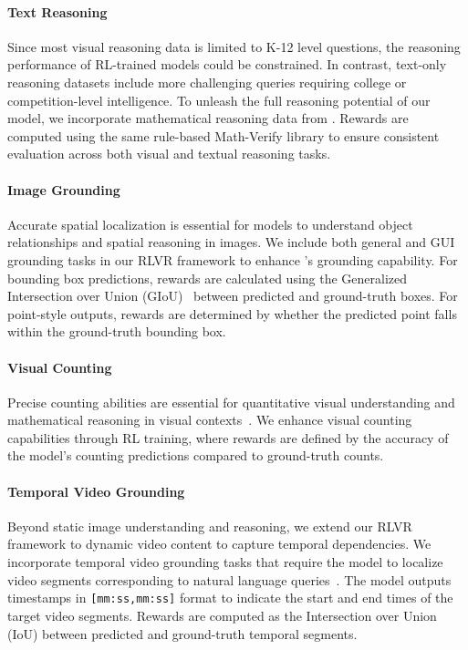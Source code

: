 \paragraph{Text Reasoning}
Since most visual reasoning data is limited to K-12 level questions, the reasoning performance of RL-trained models could be constrained.
In contrast, text-only reasoning datasets include more challenging queries requiring college or competition-level intelligence.
To unleash the full reasoning potential of our model, we incorporate mathematical reasoning data from \citet{xia2025mimo}. Rewards are computed using the same rule-based Math-Verify library to ensure consistent evaluation across both visual and textual reasoning tasks.


\paragraph{Image Grounding}
Accurate spatial localization is essential for models to understand object relationships and spatial reasoning in images. We include both general and GUI grounding tasks in our RLVR framework to enhance \mimovl{}'s grounding capability. For bounding box predictions, rewards are calculated using the Generalized Intersection over Union (GIoU)~\citep{rezatofighi2019generalized} between predicted and ground-truth boxes. For point-style outputs, rewards are determined by whether the predicted point falls within the ground-truth bounding box.

\paragraph{Visual Counting}
Precise counting abilities are essential for quantitative visual understanding and mathematical reasoning in visual contexts~\citep{chen2025r1v}. 
We enhance visual counting capabilities through RL training, where rewards are defined by the accuracy of the model's counting predictions compared to ground-truth counts.



\paragraph{Temporal Video Grounding}
Beyond static image understanding and reasoning, we extend our RLVR framework to dynamic video content to capture temporal dependencies. We incorporate temporal video grounding tasks that require the model to localize video segments corresponding to natural language queries~\citep{wang2025timezero}. The model outputs timestamps in \texttt{[mm:ss,mm:ss]} format to indicate the start and end times of the target video segments. Rewards are computed as the Intersection over Union (IoU) between predicted and ground-truth temporal segments.

